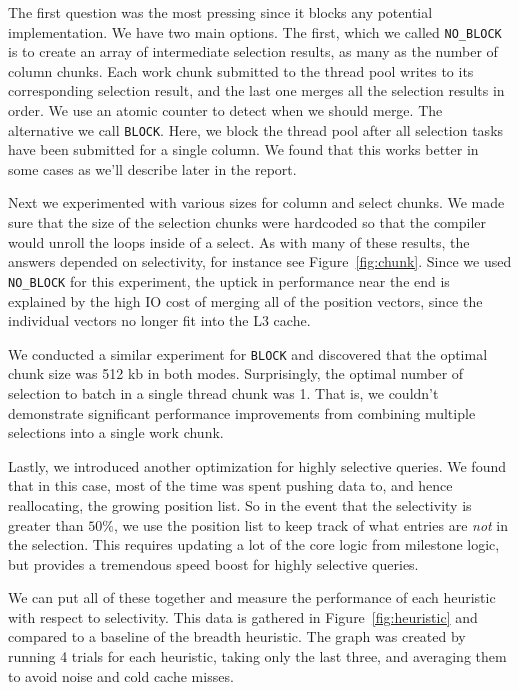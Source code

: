 \documentclass[a4paper, 12pt]{article}
\begin{document}
The first question was the most pressing since it blocks any potential implementation. We have two main options. The first, which we called \texttt{NO\_BLOCK} is to create an array of intermediate selection results, as many as the number of column chunks. Each work chunk submitted to the thread pool writes to its corresponding selection result, and the last one merges all the selection results in order. We use an atomic counter to detect when we should merge. The alternative we call \texttt{BLOCK}. Here, we block the thread pool after all selection tasks have been submitted for a single column. We found that this works better in some cases as we'll describe later in the report.

\medskip
Next we experimented with various sizes for column and select chunks. We made sure that the size of the selection chunks were hardcoded so that the compiler would unroll the loops inside of a select. As with many of these results, the answers depended on selectivity, for instance see Figure~\ref{fig:chunk}. Since we used \texttt{NO\_BLOCK} for this experiment, the uptick in performance near the end is explained by the high IO cost of merging all of the position vectors, since the individual vectors no longer fit into the L3 cache.

\medskip
We conducted a similar experiment for \texttt{BLOCK} and discovered that the optimal chunk size was 512 kb in both modes. Surprisingly, the optimal number of selection to batch in a single thread chunk was 1. That is, we couldn't demonstrate significant performance improvements from combining multiple selections into a single work chunk.

\medskip
Lastly, we introduced another optimization for highly selective queries. We found that in this case, most of the time was spent pushing data to, and hence reallocating, the growing position list. So in the event that the selectivity is greater than $50\%$, we use the position list to keep track of what entries are \textit{not} in the selection. This requires updating a lot of the core logic from milestone logic, but provides a tremendous speed boost for highly selective queries.

\medskip
We can put all of these together and measure the performance of each heuristic with respect to selectivity. This data is gathered in Figure~\ref{fig:heuristic} and compared to a baseline of the breadth heuristic. The graph was created by running 4 trials for each heuristic, taking only the last three, and averaging them to avoid noise and cold cache misses.
\end{document}
